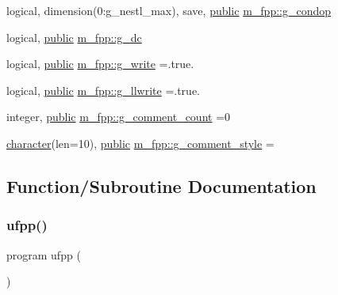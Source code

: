 \begin{DoxyCompactItemize}
\item 
logical, dimension(0\+:g\+\_\+nestl\+\_\+max), save, \hyperlink{M__stopwatch_83_8txt_a2f74811300c361e53b430611a7d1769f}{public} \hyperlink{namespacem__fpp_a380f6ad747fc050f112465e63a371e82}{m\+\_\+fpp\+::g\+\_\+condop}
\item 
logical, \hyperlink{M__stopwatch_83_8txt_a2f74811300c361e53b430611a7d1769f}{public} \hyperlink{namespacem__fpp_a546a9c9d569439024e367632ee6db908}{m\+\_\+fpp\+::g\+\_\+dc}
\item 
logical, \hyperlink{M__stopwatch_83_8txt_a2f74811300c361e53b430611a7d1769f}{public} \hyperlink{namespacem__fpp_aeb0509a3fc389c28a37387d66ead31e3}{m\+\_\+fpp\+::g\+\_\+write} =.true.
\item 
logical, \hyperlink{M__stopwatch_83_8txt_a2f74811300c361e53b430611a7d1769f}{public} \hyperlink{namespacem__fpp_a5939800574631e8265956e2bc2224a9f}{m\+\_\+fpp\+::g\+\_\+llwrite} =.true.
\item 
integer, \hyperlink{M__stopwatch_83_8txt_a2f74811300c361e53b430611a7d1769f}{public} \hyperlink{namespacem__fpp_a3cbfb5247b11d5ebe1563b7cd1564c14}{m\+\_\+fpp\+::g\+\_\+comment\+\_\+count} =0
\item 
\hyperlink{option__stopwatch_83_8txt_abd4b21fbbd175834027b5224bfe97e66}{character}(len=10), \hyperlink{M__stopwatch_83_8txt_a2f74811300c361e53b430611a7d1769f}{public} \hyperlink{namespacem__fpp_affffb83550152a13f0592ef4b30496b8}{m\+\_\+fpp\+::g\+\_\+comment\+\_\+style} =\textquotesingle{} \textquotesingle{}
\end{DoxyCompactItemize}


\subsection{Function/\+Subroutine Documentation}
\mbox{\label{ufpp_8f90_ae38e75311f766ddb27e1389ad1e8f7cc}} 
\subsubsection{\texorpdfstring{ufpp()}{ufpp()}}
{\footnotesize\ttfamily program ufpp (\begin{DoxyParamCaption}{ }\end{DoxyParamCaption})}



